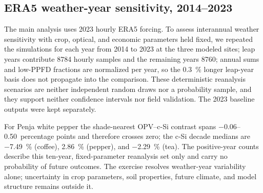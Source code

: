 \documentclass[preprint,12pt,a4paper]{elsarticle}
\begin{document}
\subsection{ERA5 weather-year sensitivity, 2014--2023}
\label{sec:sm_weather_decade}

The main analysis uses 2023 hourly ERA5 forcing. To assess interannual weather sensitivity with crop, optical, and economic parameters held fixed, we repeated the simulations for each year from 2014 to 2023 at the three modeled sites; leap years contribute 8784 hourly samples and the remaining years 8760; annual sums and low-PPFD fractions are normalized per year, so the \qty{0.3}{\percent} longer leap-year basis does not propagate into the comparison. These deterministic reanalysis scenarios are neither independent random draws nor a probability sample, and they support neither confidence intervals nor field validation. The 2023 baseline outputs were kept separately.

\begin{table}[htbp]
 \centering
 \scriptsize
 \caption{Focal ST-OPV ($D_3$, $\mathrm{APT44}$, $\mathrm{GCR}=\num{0.65}$) modeled annual crop-yield change and shade-nearest OPV--c-Si ($D_2$, $\mathrm{GCR}=\num{0.40}$) yield contrast across 2014--2023 ERA5 forcing. Means, medians, and standard deviations are across ten deterministic weather years; positive-year counts are descriptive.}
 \label{tab:weather_decade}
\end{table}

For Penja white pepper the shade-nearest OPV--c-Si contrast spans \numrange{-0.06}{+0.50}~percentage points and therefore crosses zero; the c-Si decade medians are \qty{-7.49}{\percent} (coffee), \qty{+2.86}{\percent} (pepper), and \qty{-2.29}{\percent} (tea). The positive-year counts describe this ten-year, fixed-parameter reanalysis set only and carry no probability of future outcomes. The exercise resolves weather-year variability alone; uncertainty in crop parameters, soil properties, future climate, and model structure remains outside it.
\end{document}
